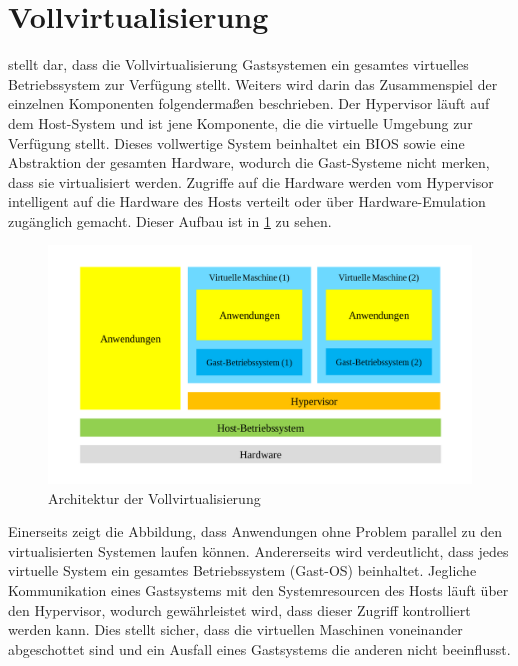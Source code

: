 \section{Vollvirtualisierung}
\label{sec:vollvirtualisierung}
\autocite{Baun2009} stellt dar, dass die Vollvirtualisierung Gastsystemen ein gesamtes virtuelles Betriebssystem zur Verfügung stellt.
Weiters wird darin das Zusammenspiel der einzelnen Komponenten folgendermaßen beschrieben.
Der Hypervisor läuft auf dem Host-System und ist jene Komponente, die die virtuelle Umgebung zur Verfügung stellt.
Dieses vollwertige System beinhaltet ein BIOS sowie eine Abstraktion der gesamten Hardware, wodurch die Gast-Systeme nicht merken, dass sie virtualisiert werden.
Zugriffe auf die Hardware werden vom Hypervisor intelligent auf die Hardware des Hosts verteilt oder über Hardware-Emulation zugänglich gemacht.
Dieser Aufbau ist in \cref{fig:architektur-vollvirtualisierung} zu sehen.
\begin{figure}[htbp]
    \centering
    \includegraphics[width=0.9\linewidth,clip]{images/vollvirtualisierung}
    \caption{Architektur der Vollvirtualisierung}
\label{fig:architektur-vollvirtualisierung}
\end{figure}
Einerseits zeigt die Abbildung, dass Anwendungen ohne Problem parallel zu den virtualisierten Systemen laufen können.
Andererseits wird verdeutlicht, dass jedes virtuelle System ein gesamtes Betriebssystem (Gast-OS) beinhaltet.
Jegliche Kommunikation eines Gastsystems mit den Systemresourcen des Hosts läuft über den Hypervisor, wodurch gewährleistet wird, dass dieser Zugriff kontrolliert werden kann.
Dies stellt sicher, dass die virtuellen Maschinen voneinander abgeschottet sind und ein Ausfall eines Gastsystems die anderen nicht beeinflusst.

